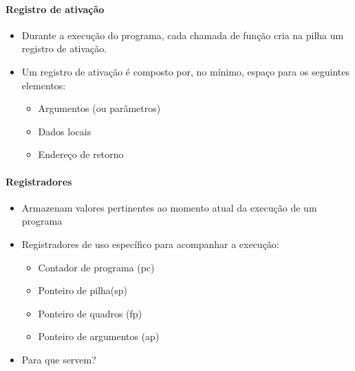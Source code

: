 \documentclass{beamer}
\newcommand{\slide}[2]{
	\begin{frame}{\insertsection}
		\framesubtitle{#1}
		#2
	\end{frame}
}
\begin{document}
\slide{Registro de ativação}{
	\begin{itemize}
		\item Durante a execução do programa, cada chamada de função cria na pilha um registro de ativação.
		\item Um registro de ativação é composto por, no mínimo, espaço para os seguintes elementos:
		      \begin{itemize}
			      \item Argumentos (ou parâmetros)
			      \item Dados locais
			      \item Endereço de retorno
		      \end{itemize}
	\end{itemize}
}

\slide{Registradores}{
	\begin{itemize}
		\item Armazenam valores pertinentes ao momento atual da execução de um programa
		\item Registradores de uso específico para acompanhar a execução:
		      \begin{itemize}
			      \item Contador de programa (pc)
			      \item Ponteiro de pilha(sp)
			      \item Ponteiro de quadros (fp)
			      \item Ponteiro de argumentos (ap)
		      \end{itemize}
		\item Para que servem?
	\end{itemize}
}
\end{document}
